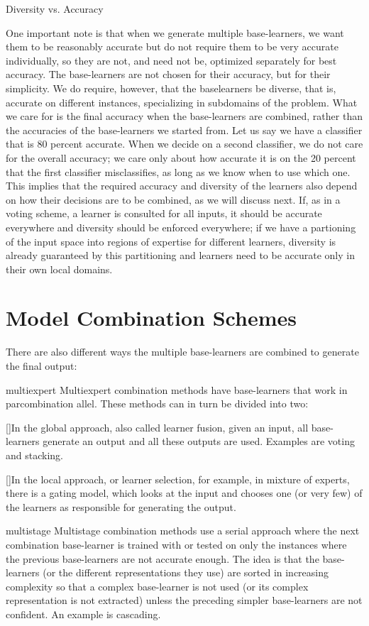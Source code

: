 Diversity vs. Accuracy

One important note is that when we generate multiple base-learners, we want them to be reasonably accurate but do not require them to be very accurate individually, so they are not, and need not be, optimized separately for best accuracy. The base-learners are not chosen for their accuracy, but for their simplicity. We do require, however, that the baselearners be diverse, that is, accurate on different instances, specializing in subdomains of the problem. What we care for is the final accuracy when the base-learners are combined, rather than the accuracies of the base-learners we started from. Let us say we have a classifier that is 80 percent accurate. When we decide on a second classifier, we do not care for the overall accuracy; we care only about how accurate it is on the 20 percent that the first classifier misclassifies, as long as we know when to use which one. This implies that the required accuracy and diversity of the learners also depend on how their decisions are to be combined, as we will discuss next. If, as in a voting scheme, a learner is consulted for all inputs, it should be accurate everywhere and diversity should be enforced everywhere; if we have a partioning of the input space into regions of expertise for different learners, diversity is already guaranteed by this partitioning and learners need to be accurate only in their own local domains.

\section{Model Combination Schemes}

There are also different ways the multiple base-learners are combined to generate the final output:

multiexpert Multiexpert combination methods have base-learners that work in parcombination allel. These methods can in turn be divided into two:

[]In the global approach, also called learner fusion, given an input, all base-learners generate an output and all these outputs are used. Examples are voting and stacking.

[]In the local approach, or learner selection, for example, in mixture of experts, there is a gating model, which looks at the input and chooses one (or very few) of the learners as responsible for generating the output.

multistage Multistage combination methods use a serial approach where the next combination base-learner is trained with or tested on only the instances where the previous base-learners are not accurate enough. The idea is that the base-learners (or the different representations they use) are sorted in increasing complexity so that a complex base-learner is not used (or its complex representation is not extracted) unless the preceding simpler base-learners are not confident. An example is cascading.

